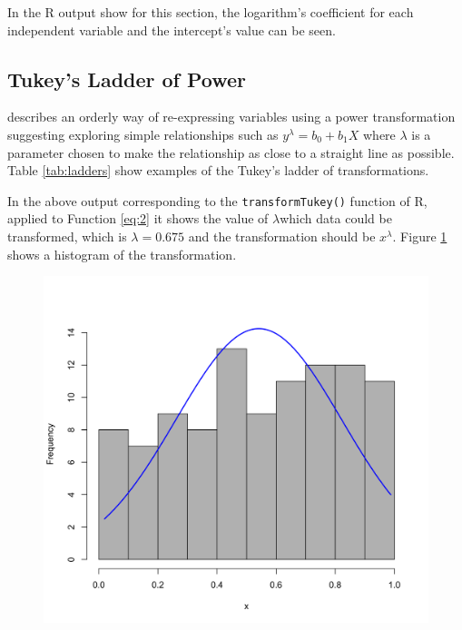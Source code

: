 \documentclass[10pt,leter,openany]{article}
\begin{document}
		
		In the R output show for this section, the logarithm's coefficient for each independent variable and the intercept's value can be seen.
		
		\subsection{Tukey's Ladder of Power}
		
		\citet{tukey1977exploratory} describes an orderly way of re-expressing variables using a power transformation suggesting exploring simple relationships such as $ y^{\lambda} = b_{0} + b_{1}X $ where $\lambda$ is a parameter chosen to make the relationship as close to a straight line as possible. Table \ref{tab:ladders} show examples of the Tukey's ladder of transformations.
		
			
			In the above output corresponding to the \texttt{transformTukey()} function of R, applied to Function \ref{eq:2} it shows the value of $\lambda$which data could be transformed, which is $\lambda = 0.675$ and the transformation should be $x^\lambda$. Figure \ref{fig:tukey} shows a histogram of the transformation.
			
			\begin{figure}
				\begin{center}
					\includegraphics[scale=0.15]{extras/tukeyimg}
					\label{fig:tukey}
				\end{center}
			\end{figure}			
		
\end{document}
